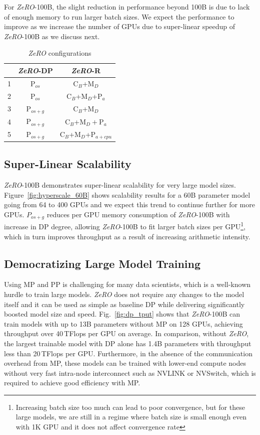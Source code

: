 \documentclass{article}
\newcommand{\name}{\emph{ZeRO}\xspace}
\begin{document}
For \name-100B, the slight reduction in performance beyond 100B is due to lack of enough memory to run larger batch sizes. We expect the performance to improve as we increase the number of GPUs due to super-linear speedup of \name-100B as we discuss next. 
\begin{table}\centering
         \begin{tabular}{|c|c|c|}
         \hline
         & \name-DP & \name-R \\
         \hline
         1 & P$_{os}$&C$_{B}$+M$_{D}$\\
         \hline
         2 & P$_{os}$&C$_{B}$+M$_{D}$+P$_{a}$\\
         \hline
         3 & P$_{os+g}$&C$_{B}$+M$_{D}$\\
         \hline
         4 & P$_{os+g}$&C$_{B}$+M$_{D}+$P$_{a}$\\
         \hline
         5 & P$_{os+g}$&C$_{B}$+M$_{D}$+P$_{a+cpu}$\\
         \hline
         \end{tabular}
     \caption{\name configurations}\label{tab:Opt-table}

\end{table}
\subsection{Super-Linear Scalability}
\name-100B demonstrates super-linear scalability for very large model sizes. Figure~\ref{fig:hyperscale_60B} shows scalability results for a 60B parameter model going from 64 to 400 GPUs and we expect this trend to continue further for more GPUs. $P_{os+g}$ reduces per GPU memory consumption of \name-100B with increase in DP degree, allowing \name-100B to fit larger batch sizes per GPU\footnote{Increasing batch size too much can lead to poor convergence, but for these large models, we are still in a regime where batch size is small enough even with 1K GPU and it does not affect convergence rate}, which in turn improves throughput as a result of increasing arithmetic intensity. 

\subsection{Democratizing Large Model Training}
Using MP and PP is challenging for many data scientists, which is a well-known hurdle to train large models.  \name does not require any changes to the model itself and it can be used as simple as baseline DP while delivering significantly boosted model size and speed.  Fig.~\ref{fig:dp_tput} shows that \name-100B can train models with up to 13B parameters without MP on 128 GPUs, achieving throughput over 40\,TFlops per GPU on average. In comparison, without \name, the largest trainable model with DP alone has 1.4B parameters with throughput less than 20\,TFlops per GPU. 
Furthermore, in the absence of the communication overhead from MP, these models can be trained with lower-end compute nodes without very fast intra-node interconnect such as NVLINK or NVSwitch, which is required to achieve good efficiency with MP.  
\end{document}
